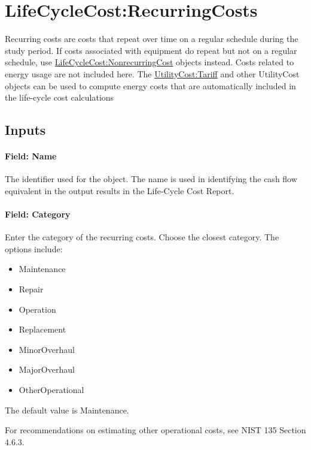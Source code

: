 \section{LifeCycleCost:RecurringCosts}\label{lifecyclecostrecurringcosts}

Recurring costs are costs that repeat over time on a regular schedule during the study period. If costs associated with equipment do repeat but not on a regular schedule, use \hyperref[lifecyclecostnonrecurringcost]{LifeCycleCost:NonrecurringCost} objects instead. Costs related to energy usage are not included here. The \hyperref[utilitycosttariff]{UtilityCost:Tariff} and other UtilityCost objects can be used to compute energy costs that are automatically included in the life-cycle cost calculations

\subsection{Inputs}\label{inputs-059}

\paragraph{Field: Name}\label{field-name-057}

The identifier used for the object. The name is used in identifying the cash flow equivalent in the output results in the Life-Cycle Cost Report.

\paragraph{Field: Category}\label{field-category-000}

Enter the category of the recurring costs. Choose the closest category. The options include:

\begin{itemize}
\item
  Maintenance
\item
  Repair
\item
  Operation
\item
  Replacement
\item
  MinorOverhaul
\item
  MajorOverhaul
\item
  OtherOperational
\end{itemize}

The default value is Maintenance.

For recommendations on estimating other operational costs, see NIST 135 Section 4.6.3.


